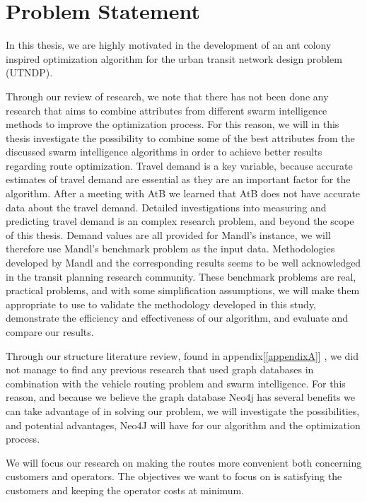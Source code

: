 \section{Problem Statement}
In this thesis, we are highly motivated in the development of an ant colony inspired optimization algorithm for the urban transit network design problem (UTNDP).  

Through our review of research, we note that there has not been done any research that aims to combine attributes from different swarm intelligence methods to improve the optimization process. For this reason, we will in this thesis investigate the possibility to combine some of the best attributes from the discussed swarm intelligence algorithms in order to achieve better results regarding route optimization. Travel demand is a key variable, because accurate estimates of travel demand are essential as they are an important factor for the algorithm. After a meeting with AtB we learned that AtB does not have accurate data about the travel demand. Detailed investigations into measuring and predicting travel demand is an complex research problem, and beyond the scope of this thesis. Demand values are all provided for Mandl's instance, we will therefore use Mandl's benchmark problem \citep{mandl79} as the input data. Methodologies developed by Mandl and the corresponding results seems to be well acknowledged in the transit planning research community. These benchmark problems are real, practical problems, and with some simplification assumptions, we will make them appropriate to use to validate the methodology developed in this study, demonstrate the efficiency and effectiveness of our algorithm, and evaluate and compare our results. 

Through our structure literature review, found in appendix[\ref{appendixA}]%
, we did not manage to find any previous research that used graph databases in combination with the vehicle routing problem and swarm intelligence.
For this reason, and because we believe the graph database Neo4j \citep{website:neo4j} has several benefits we can take advantage of in solving our problem, %
we will investigate the possibilities, and potential advantages, Neo4J will have for our algorithm and the optimization process. 

We will focus our research on making the routes more convenient both concerning customers and operators. The objectives we want to focus on is satisfying the customers and keeping the operator costs at minimum. 

